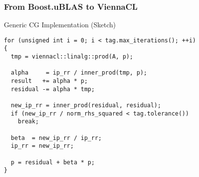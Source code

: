 \begin{frame}[fragile]
\frametitle{From Boost.uBLAS to ViennaCL}
\begin{block}{Generic CG Implementation (Sketch)}
  \begin{lstlisting}
for (unsigned int i = 0; i < tag.max_iterations(); ++i)
{
  tmp = viennacl::linalg::prod(A, p);

  alpha     = ip_rr / inner_prod(tmp, p);
  result   += alpha * p;
  residual -= alpha * tmp;
        
  new_ip_rr = inner_prod(residual, residual);
  if (new_ip_rr / norm_rhs_squared < tag.tolerance())
    break;
        
  beta  = new_ip_rr / ip_rr;
  ip_rr = new_ip_rr;

  p = residual + beta * p;
} 
  \end{lstlisting} 
\end{block}

\end{frame}




